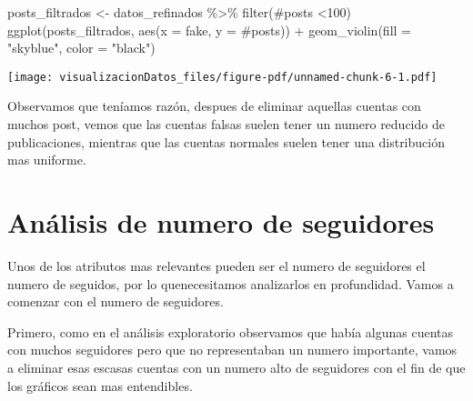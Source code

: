 \documentclass[
  letterpaper,
  DIV=11,
  numbers=noendperiod]{scrreprt}
\newenvironment{Shaded}{\begin{snugshade}}{\end{snugshade}}
\newcommand{\AttributeTok}[1]{\textcolor[rgb]{0.40,0.45,0.13}{#1}}
\newcommand{\DecValTok}[1]{\textcolor[rgb]{0.68,0.00,0.00}{#1}}
\newcommand{\FunctionTok}[1]{\textcolor[rgb]{0.28,0.35,0.67}{#1}}
\newcommand{\NormalTok}[1]{\textcolor[rgb]{0.00,0.23,0.31}{#1}}
\newcommand{\OtherTok}[1]{\textcolor[rgb]{0.00,0.23,0.31}{#1}}
\newcommand{\SpecialCharTok}[1]{\textcolor[rgb]{0.37,0.37,0.37}{#1}}
\newcommand{\StringTok}[1]{\textcolor[rgb]{0.13,0.47,0.30}{#1}}
\begin{document}
\begin{Shaded}
\begin{Highlighting}[]
\NormalTok{posts\_filtrados }\OtherTok{\textless{}{-}}\NormalTok{ datos\_refinados }\SpecialCharTok{\%\textgreater{}\%}  \FunctionTok{filter}\NormalTok{(}\StringTok{\textasciigrave{}}\AttributeTok{\#posts}\StringTok{\textasciigrave{}} \SpecialCharTok{\textless{}}\DecValTok{100}\NormalTok{)}
\FunctionTok{ggplot}\NormalTok{(posts\_filtrados, }\FunctionTok{aes}\NormalTok{(}\AttributeTok{x =}\NormalTok{ fake, }\AttributeTok{y =} \StringTok{\textasciigrave{}}\AttributeTok{\#posts}\StringTok{\textasciigrave{}}\NormalTok{)) }\SpecialCharTok{+}
  \FunctionTok{geom\_violin}\NormalTok{(}\AttributeTok{fill =} \StringTok{"skyblue"}\NormalTok{, }\AttributeTok{color =} \StringTok{"black"}\NormalTok{) }
\end{Highlighting}
\end{Shaded}

\texttt{[image: visualizacionDatos\_files/figure-pdf/unnamed-chunk-6-1.pdf]}

Observamos que teníamos razón, despues de eliminar aquellas cuentas con
muchos post, vemos que las cuentas falsas suelen tener un numero
reducido de publicaciones, mientras que las cuentas normales suelen
tener una distribución mas uniforme.

\section{Análisis de numero de
seguidores}\label{anuxe1lisis-de-numero-de-seguidores}

Unos de los atributos mas relevantes pueden ser el numero de seguidores
el numero de seguidos, por lo quenecesitamos analizarlos en profundidad.
Vamos a comenzar con el numero de seguidores.

Primero, como en el análisis exploratorio observamos que había algunas
cuentas con muchos seguidores pero que no representaban un numero
importante, vamos a eliminar esas escasas cuentas con un numero alto de
seguidores con el fin de que los gráficos sean mas entendibles.
\end{document}
